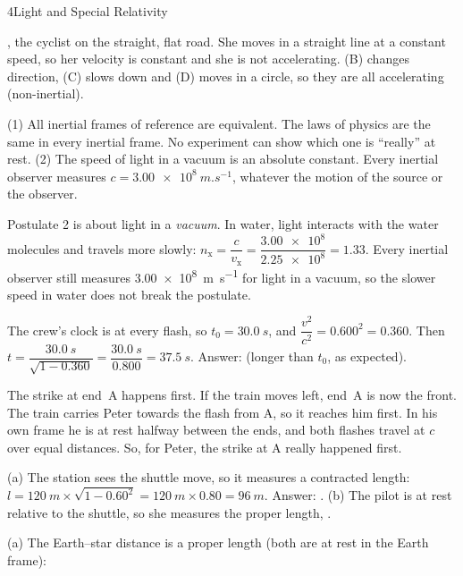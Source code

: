 \begin{chapteranswers}{4}{Light and Special Relativity}
  \item {}, the cyclist on the straight, flat road. She moves in a straight line at a
        constant speed, so her velocity is constant and she is not accelerating. (B) changes
        direction, (C) slows down and (D) moves in a circle, so they are all accelerating
        (non-inertial).
  \item (1) All inertial frames of reference are equivalent. The laws of physics are the same in
        every inertial frame. No experiment can show which one is ``really'' at rest.
        (2) The speed of light in a vacuum is an absolute constant. Every inertial observer
        measures $c = \qty{3.00e8}{m.s^{-1}}$, whatever the motion of the source or the observer.
  \item Postulate 2 is about light in a \emph{vacuum}. In water, light interacts with the water
        molecules and travels more slowly: $n_\mathrm{x} = \dfrac{c}{v_\mathrm{x}} = \dfrac{\num{3.00e8}}{\num{2.25e8}}
        = 1.33$. Every inertial observer still measures \qty{3.00e8}{m.s^{-1}} for light in a
        vacuum, so the slower speed in water does not break the postulate.
  \item The crew's clock is at every flash, so $t_0 = \qty{30.0}{s}$, and
        $\dfrac{v^2}{c^2} = 0.600^2 = 0.360$. Then
        $t = \dfrac{\qty{30.0}{s}}{\sqrt{1 - 0.360}} = \dfrac{\qty{30.0}{s}}{0.800}
        = \qty{37.5}{s}$. Answer:  (longer than $t_0$, as expected).
  \item The strike at end~A happens first. If the train moves left, end~A is now the front.
        The train carries Peter towards the flash from A, so it reaches him first. In his own
        frame he is at rest halfway between the ends, and both flashes travel at $c$ over equal
        distances. So, for Peter, the strike at A really happened first.
  \item (a) The station sees the shuttle move, so it measures a contracted length:
        $l = \qty{120}{m} \times \sqrt{1 - 0.60^2} = \qty{120}{m} \times 0.80 = \qty{96}{m}$.
        Answer: . (b) The pilot is at rest relative to the shuttle, so she
        measures the proper length, .
  \item (a) The Earth--star distance is a proper length (both are at rest in the Earth frame):

\end{chapteranswers}

